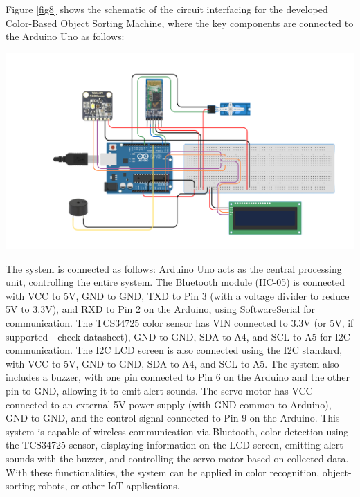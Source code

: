 \documentclass[conference, onecolumn]{IEEEtran}
\begin{document}
\vspace{2em}

Figure \ref{fig8} shows the schematic of the circuit interfacing for the developed Color-Based Object Sorting Machine, where the key components are connected to the Arduino Uno as follows:
    \begin{center}
    \includegraphics[width=\textwidth]{IOT-Color-Based Object Sorting Machine/Devices_and_Connection_Diagram.png}
    \label{fig8}
    \end{center}
The system is connected as follows: Arduino Uno acts as the central processing unit, controlling the entire system. The Bluetooth module (HC-05) is connected with VCC to 5V, GND to GND, TXD to Pin 3 (with a voltage divider to reduce 5V to 3.3V), and RXD to Pin 2 on the Arduino, using SoftwareSerial for communication. The TCS34725 color sensor has VIN connected to 3.3V (or 5V, if supported—check datasheet), GND to GND, SDA to A4, and SCL to A5 for I2C communication. The I2C LCD screen is also connected using the I2C standard, with VCC to 5V, GND to GND, SDA to A4, and SCL to A5.
The system also includes a buzzer, with one pin connected to Pin 6 on the Arduino and the other pin to GND, allowing it to emit alert sounds. The servo motor has VCC connected to an external 5V power supply (with GND common to Arduino), GND to GND, and the control signal connected to Pin 9 on the Arduino.
This system is capable of wireless communication via Bluetooth, color detection using the TCS34725 sensor, displaying information on the LCD screen, emitting alert sounds with the buzzer, and controlling the servo motor based on collected data. With these functionalities, the system can be applied in color recognition, object-sorting robots, or other IoT applications.
 \vspace{3em}
\end{document}
